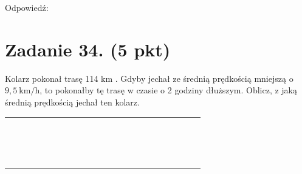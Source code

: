 \documentclass[10pt]{article}
\begin{document}
Odpowiedź:

\section*{Zadanie 34. (5 pkt)}
Kolarz pokonał trasę 114 km . Gdyby jechał ze średnią prędkością mniejszą o \(9,5 \mathrm{~km} / \mathrm{h}\), to pokonałby tę trasę w czasie o 2 godziny dłuższym. Oblicz, z jaką średnią prędkością jechał ten kolarz.

\begin{center}
\begin{tabular}{|c|c|c|c|c|c|c|c|c|c|c|c|c|c|c|c|c|c|c|c|c|c|c|}
\hline
 &  &  &  &  &  &  &  &  &  &  &  &  &  &  &  &  &  &  &  &  &  &  \\
\hline
 &  &  &  &  &  &  &  &  &  &  &  &  &  &  &  &  &  &  &  &  &  &  \\
\hline
 &  &  &  &  &  &  &  &  &  &  &  &  &  &  &  &  &  &  &  &  &  &  \\
\hline
 &  &  &  &  &  &  &  &  &  &  &  &  &  &  &  &  &  &  &  &  &  &  \\
\hline
 &  &  &  &  &  &  &  &  &  &  &  &  &  &  &  &  &  &  &  &  &  &  \\
\hline
 &  &  &  &  &  &  &  &  &  &  &  &  &  &  &  &  &  &  &  &  &  &  \\
\hline
 &  &  &  &  &  &  &  &  &  &  &  &  &  &  &  &  &  &  &  &  &  &  \\
\hline
 &  &  &  &  &  &  &  &  &  &  &  &  &  &  &  &  &  &  &  &  &  &  \\
\hline
 &  &  &  &  &  &  &  &  &  &  &  &  &  &  &  &  &  &  &  &  &  &  \\
\hline
 &  &  &  &  &  &  &  &  &  &  &  &  &  &  &  &  &  &  &  &  &  &  \\
\hline
 &  &  &  &  &  &  &  &  &  &  &  &  &  &  &  &  &  &  &  &  &  &  \\
\hline
 &  &  &  &  &  &  &  &  &  &  &  &  &  &  &  &  &  &  &  &  &  &  \\
\hline
 &  &  &  &  &  &  &  &  &  &  &  &  &  &  &  &  &  &  &  &  &  &  \\
\hline
 &  &  &  &  &  &  &  &  &  &  &  &  &  &  &  &  &  &  &  &  &  &  \\
\hline
 &  &  &  &  &  &  &  &  &  &  &  &  &  &  &  &  &  &  &  &  &  &  \\
\hline
 &  &  &  &  &  &  &  &  &  &  &  &  &  &  &  &  &  &  &  &  &  &  \\
\hline
 &  &  &  &  &  &  &  &  &  &  &  &  &  &  &  &  &  &  &  &  &  &  \\

\end{tabular}
\end{center}
\end{document}
